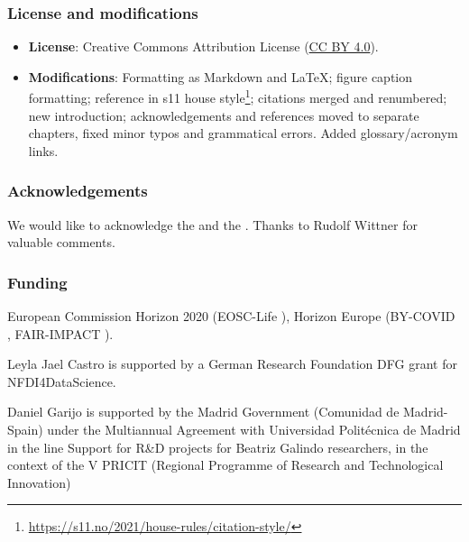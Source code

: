 \subsubsection*{License and modifications}

\begin{itemize}
\tightlist
\item
  \textbf{License}: Creative Commons Attribution License
  (\href{https://spdx.org/licenses/CC-BY-4.0}{CC BY 4.0}).
\item
  \textbf{Modifications}: Formatting as Markdown and LaTeX; figure caption
		formatting; reference in s11 house style\footnote{\url{https://s11.no/2021/house-rules/citation-style/}}; citations merged and renumbered; new introduction;
  acknowledgements and references moved to separate chapters, fixed minor typos and grammatical errors.  Added glossary/acronym links.
\end{itemize}

\subsubsection*{Acknowledgements}

We would like to acknowledge the
 and the
. Thanks to Rudolf Wittner for valuable comments.

\subsubsection*{Funding}

European Commission Horizon 2020 (EOSC-Life
), Horizon
Europe (BY-COVID
,
FAIR-IMPACT
).

Leyla Jael Castro is supported by a German Research Foundation DFG grant
for NFDI4DataScience.

Daniel Garijo is supported by the Madrid Government (Comunidad de
Madrid-Spain) under the Multiannual Agreement with Universidad
Politécnica de Madrid in the line Support for R\&D projects for Beatriz
Galindo researchers, in the context of the V PRICIT (Regional Programme
of Research and Technological Innovation)




